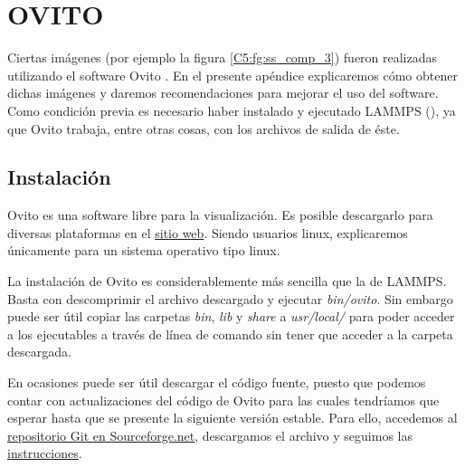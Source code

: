 
\chapter{OVITO} %

\label{AB} %


Ciertas imágenes (por ejemplo la figura \ref{C5:fg:ss_comp_3}) fueron realizadas utilizando el software Ovito \citep{stukowski10}. En el presente apéndice explicaremos cómo obtener dichas imágenes y daremos recomendaciones para mejorar el uso del software. Como condición previa es necesario haber instalado y ejecutado LAMMPS (), ya que Ovito trabaja, entre otras cosas, con los archivos de salida de éste.

\section{Instalación}
\label{AB_1}

Ovito es una software libre para la visualización. Es posible descargarlo para diversas plataformas en el \href{http://www.ovito.org/index.php/download}{sitio web}. Siendo usuarios linux, explicaremos únicamente para un sistema operativo tipo linux.

La instalación de Ovito es considerablemente más sencilla que la de LAMMPS. Basta con descomprimir el archivo descargado y ejecutar \textit{bin/ovito}. Sin embargo puede ser útil copiar las carpetas \textit{bin}, \textit{lib} y \textit{share} a \textit{usr/local/} para poder acceder a los ejecutables a través de línea de comando sin tener que acceder a la carpeta descargada.

En ocasiones puede ser útil descargar el código fuente, puesto que podemos contar con actualizaciones del código de Ovito para las cuales tendríamos que esperar hasta que se presente la siguiente versión estable. Para ello, accedemos al \href{http://sourceforge.net/p/ovito/git/ci/master/tree/}{repositorio Git en Sourceforge.net}, descargamos el archivo y seguimos las \href{http://www.ovito.org/manual/development.build_linux.html}{instrucciones}.

